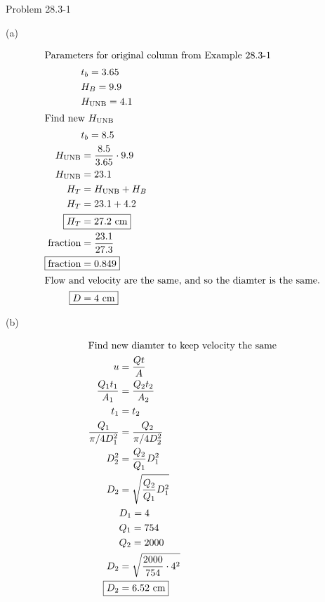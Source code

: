 \item Problem 28.3-1

(a)

\begin{align*}
    \intertext{Parameters for original column from Example 28.3-1}
    & t_b = 3.65 \\
    & H_B = 9.9  \\
    & H_{\text{UNB}} = 4.1 \\
    \intertext{Find new $H_{\text{UNB}}$}
    & t_b = 8.5 \\
    H_{\text{UNB}} &= \frac{8.5}{3.65} \cdot 9.9 \\
    H_{\text{UNB}} &= 23.1 \\
    H_T &= H_{\text{UNB}} + H_B \\
    H_T &= 23.1 + 4.2 \\
    \Aboxed{H_T &= 27.2 \text{ cm}} \\
    \text{fraction} &= \frac{23.1}{27.3} \\
    \Aboxed{\text{fraction} &= 0.849} \\
    \intertext{Flow and velocity are the same, and so the diamter is the same.}
    \Aboxed{D &= 4 \text{ cm}}
\end{align*}

\newpage
(b)

\begin{align*}
    \intertext{Find new diamter to keep velocity the same}
    u &= \frac{Q t}{A} \\
    \frac{Q_1 t_1}{A_1} &= \frac{Q_2 t_2}{A_2} \\
    t_1 &= t_2 \\ 
    \frac{Q_1}{\pi/4D_1^2} &= \frac{Q_2}{\pi/4D_2^2} \\
    D_2^2 &= \frac{Q_2}{Q_1} D_1^2 \\
    D_2 &= \sqrt{\frac{Q_2}{Q_1} D_1^2} \\
    & D_1 = 4 \\
    & Q_1 = 754 \\
    & Q_2 = 2000 \\
    D_2 &= \sqrt{\frac{2000}{754} \cdot 4^2} \\
    \Aboxed{D_2 &= 6.52 \text{ cm}}
\end{align*}